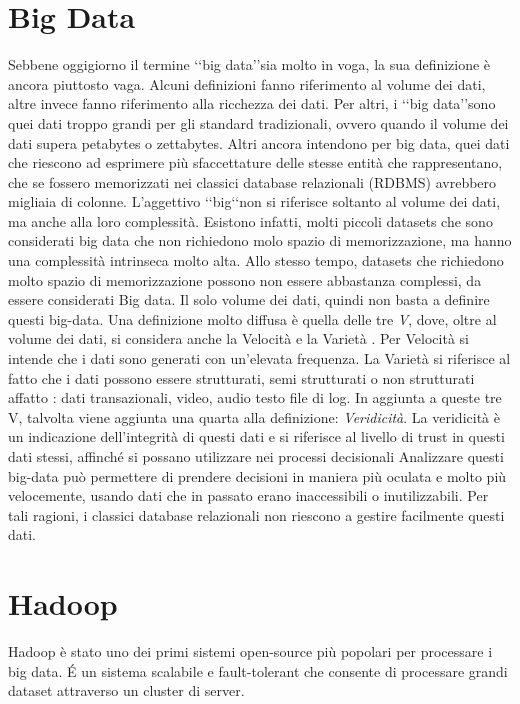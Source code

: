 \section{Big Data}
Sebbene oggigiorno il termine \lq\lq big data\rq\rq sia molto in voga, la sua definizione è ancora piuttosto vaga. Alcuni definizioni fanno riferimento al volume dei dati, altre  invece fanno riferimento alla ricchezza dei dati. Per altri, i \lq\lq big data\rq\rq sono   quei dati troppo grandi per gli standard tradizionali, ovvero quando il volume dei dati supera petabytes o zettabytes. Altri ancora intendono per big data, quei dati che riescono ad esprimere più sfaccettature delle stesse entità che rappresentano, che se fossero memorizzati nei classici database relazionali (RDBMS) avrebbero migliaia di colonne. 
L'aggettivo \lq\lq big\lq\lq non si riferisce soltanto al volume dei dati, ma anche alla loro complessità. Esistono infatti, molti piccoli datasets che  sono considerati big data che non richiedono molo spazio di memorizzazione, ma hanno una complessità intrinseca molto alta. Allo stesso tempo, datasets che richiedono molto spazio di memorizzazione possono non essere abbastanza complessi, da essere considerati Big data. Il solo volume dei dati, quindi non basta a definire questi big-data. Una definizione molto diffusa è quella delle tre \emph{V}, dove, oltre al volume dei dati, si considera anche la Velocità e la Varietà .
Per Velocità si intende che i dati sono generati con un'elevata frequenza.
La Varietà si riferisce al fatto che i dati possono essere  strutturati, semi strutturati o non strutturati affatto : dati transazionali, video, audio testo file di log.
In aggiunta a queste tre V, talvolta viene aggiunta una quarta alla definizione: \emph{Veridicità}.
La veridicità è un indicazione dell'integrità di questi dati e si riferisce al livello di trust in questi dati stessi, affinché si possano utilizzare nei processi decisionali
Analizzare questi big-data può permettere  di prendere decisioni in maniera più oculata e molto più velocemente, usando dati che in passato erano inaccessibili o inutilizzabili.
Per tali ragioni, i classici database relazionali non riescono a gestire facilmente questi dati.
\section{Hadoop}
Hadoop è stato uno dei primi sistemi open-source più popolari per processare i big data.
\'E un sistema scalabile e fault-tolerant che consente di processare grandi dataset attraverso un cluster di server.  


